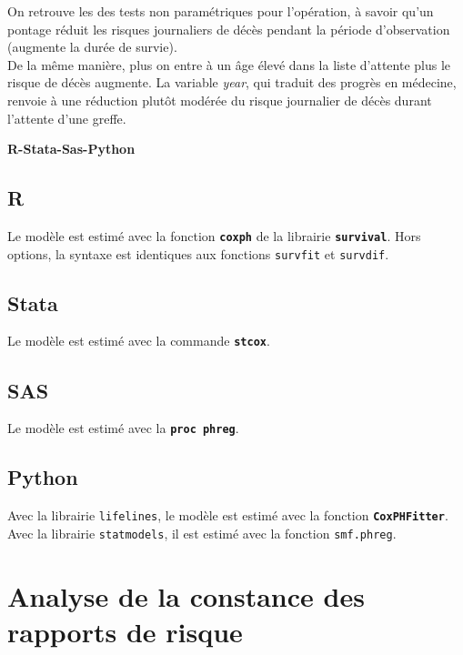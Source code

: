 \documentclass[
  12pt,
  letterpaper,
  DIV=11,
  numbers=noendperiod,
  onepage,
  openany]{scrreprt}
\begin{document}
On retrouve les des tests non paramétriques pour l'opération, à savoir
qu'un pontage réduit les risques journaliers de décès pendant la période
d'observation (augmente la durée de survie).\\
De la même manière, plus on entre à un âge élevé dans la liste d'attente
plus le risque de décès augmente. La variable \emph{year}, qui traduit
des progrès en médecine, renvoie à une réduction plutôt modérée du
risque journalier de décès durant l'attente d'une greffe.

\textbf{R-Stata-Sas-Python}

\subsection{R}

Le modèle est estimé avec la fonction \textbf{\texttt{coxph}} de la
librairie \textbf{\texttt{survival}}. Hors options, la syntaxe est
identiques aux fonctions \texttt{survfit} et \texttt{survdif}.

\subsection{Stata}

Le modèle est estimé avec la commande \textbf{\texttt{stcox}}.

\subsection{SAS}

Le modèle est estimé avec la \textbf{\texttt{proc\ phreg}}.

\subsection{Python}

Avec la librairie \texttt{lifelines}, le modèle est estimé avec la
fonction \textbf{\texttt{CoxPHFitter}}. Avec la librairie
\texttt{statmodels}, il est estimé avec la fonction \texttt{smf.phreg}.

\hypertarget{analyse-de-la-constance-des-rapports-de-risque}{%
\section{Analyse de la constance des rapports de
risque}\label{analyse-de-la-constance-des-rapports-de-risque}}
\end{document}
